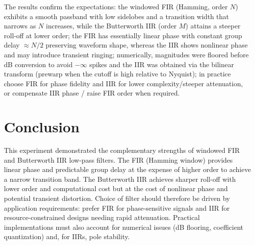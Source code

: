 \documentclass[11pt]{article}
\begin{document}
The results confirm the expectations: the windowed FIR (Hamming, order $N$) exhibits a smooth passband with low sidelobes and a transition width that narrows as $N$ increases, while the Butterworth IIR (order $M$) attains a steeper roll‑off at lower order; the FIR has essentially linear phase with constant group delay $\approx N/2$ preserving waveform shape, whereas the IIR shows nonlinear phase and may introduce transient ringing; numerically, magnitudes were floored before dB conversion to avoid $-\infty$ spikes and the IIR was obtained via the bilinear transform (prewarp when the cutoff is high relative to Nyquist); in practice choose FIR for phase fidelity and IIR for lower complexity/steeper attenuation, or compensate IIR phase / raise FIR order when required.

\section*{Conclusion}

This experiment demonstrated the complementary strengths of windowed FIR and Butterworth IIR low-pass filters. The FIR (Hamming window) provides linear phase and predictable group delay at the expense of higher order to achieve a narrow transition band. The Butterworth IIR achieves sharper roll-off with lower order and computational cost but at the cost of nonlinear phase and potential transient distortion. Choice of filter should therefore be driven by application requirements: prefer FIR for phase-sensitive signals and IIR for resource-constrained designs needing rapid attenuation. Practical implementations must also account for numerical issues (dB flooring, coefficient quantization) and, for IIRs, pole stability.



\renewcommand{\bibname}{References}

\end{document}
